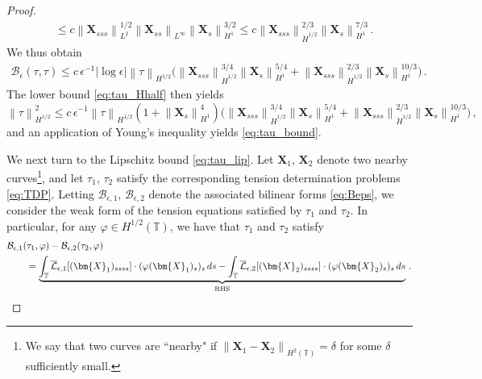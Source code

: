 \documentclass[11pt,reqno]{amsart}
\newcommand{\T}{\mathbb{T}}
\newcommand{\X}{\bm{X}}
\newcommand{\abs}[1]{\left\lvert #1 \right\rvert}
\newcommand{\norm}[1]{\left\lVert #1 \right\rVert}
\newcommand{\mc}[1]{\mathcal{#1}}
\numberwithin{equation}{section}
\theoremstyle{definition}
\begin{document}
\begin{proof}
\begin{equation}
\begin{aligned}
  &\le c\norm{\X_{sss}}_{L^2}^{1/2}\norm{\X_{ss}}_{L^\infty}\norm{\X_s}_{H^1}^{3/2}
  \le c\norm{\X_{sss}}_{\dot H^{1/2}}^{2/3}\norm{\X_s}_{H^1}^{7/3}\,.
\end{aligned}
\end{equation}
%
We thus obtain 
\begin{equation}
\begin{aligned}
  \mc{B}_\epsilon(\tau,\tau)\le c\,\epsilon^{-1}\abs{\log\epsilon} \norm{\tau}_{H^{1/2}}\big(\norm{\X_{sss}}_{\dot H^{1/2}}^{3/4}\norm{\X_s}_{H^1}^{5/4}+ \norm{\X_{sss}}_{\dot H^{1/2}}^{2/3}\norm{\X_s}_{H^1}^{10/3}\big)\,.
\end{aligned}
\end{equation}
%
%
The lower bound \eqref{eq:tau_Hhalf} then yields
\begin{equation}
  \norm{\tau}_{H^{1/2}}^2\le c\,\epsilon^{-1} \norm{\tau}_{H^{1/2}}(1+\norm{\X_s}_{H^1}^4)\big(\norm{\X_{sss}}_{\dot H^{1/2}}^{3/4}\norm{\X_s}_{H^1}^{5/4}+ \norm{\X_{sss}}_{\dot H^{1/2}}^{2/3}\norm{\X_s}_{H^1}^{10/3}\big)\,,
\end{equation}
and an application of Young's inequality yields \eqref{eq:tau_bound}.


We next turn to the Lipschitz bound \eqref{eq:tau_lip}. 
Let $\X_1$, $\X_2$ denote two nearby curves\footnote{We say that two curves are ``nearby" if $\norm{\X_1-\X_2}_{H^2(\T)}=\delta$ for some $\delta$ sufficiently small.}, and let $\tau_1$, $\tau_2$ satisfy the corresponding tension determination problems \eqref{eq:TDP}. Letting $\mc{B}_{\epsilon,1}$, $\mc{B}_{\epsilon,2}$ denote the associated bilinear forms \eqref{eq:Beps}, we consider the weak form of the tension equations satisfied by $\tau_1$ and $\tau_2$. In particular, for any $\varphi\in H^{1/2}(\T)$, we have that $\tau_1$ and $\tau_2$ satisfy
\begin{equation}\label{eq:B1B2eqn}
\begin{aligned}
  &\mc{B}_{\epsilon,1}(\tau_1,\varphi) - \mc{B}_{\epsilon,2}(\tau_2,\varphi)\\
  &\qquad= \underbrace{\int_\T\overline{\mc{L}}_{\epsilon,1}[(\X_1)_{ssss}]\cdot(\varphi(\X_1)_s)_s\,ds
  - \int_\T\overline{\mc{L}}_{\epsilon,2}[(\X_2)_{ssss}]\cdot(\varphi(\X_2)_s)_s\,ds}_{\rm{RHS}}\,.
\end{aligned}
\end{equation}



\end{proof}
\end{document}
